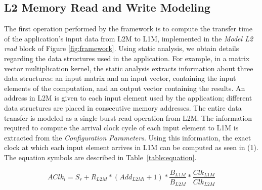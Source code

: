 \subsection{L2 Memory Read and Write Modeling}
\label{ssec:l2_read_model}
\vspace{-1mm}
The first operation performed by the framework is to compute the transfer time of the application's input data from L2M to L1M, implemented in the \textit{Model L2 read} block of Figure \ref{fig:framework}. Using static analysis, we obtain details regarding the data structures used in the application. For example, in a matrix vector multiplication kernel, the static analysis extracts information about three data structures: an input matrix and an input vector, containing the input elements of the computation, and an output vector containing the results. An address in L2M is given to each input element used by the application; different data structures are placed in consecutive memory addresses. The entire data transfer is modeled as a single burst-read operation from L2M. The information required to compute the arrival clock cycle of each input element to L1M is extracted from the \textit{Configuration Parameters}.
Using this information, the exact clock at which each input element arrives in L1M can be computed as seen in (1). The equation symbols are described in Table~\ref{table:equation}.

\begin{equation}
AClk_i = S_r + R_{L2M} * (Add_{L2Mi}+1) * \frac{B_{L1M}}{B_{L2M}} * \frac{Clk_{L1M}}{Clk_{L2M}}
\end{equation}


